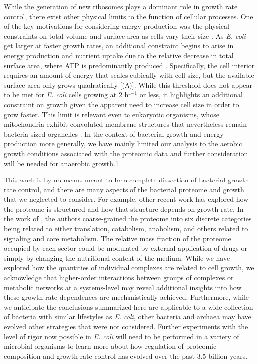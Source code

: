 While the generation of new ribosomes plays a dominant role in growth rate
control, there exist other physical limits to the function of cellular
processes. One of the key motivations for considering energy production was the
physical constraints on total volume and surface area as cells vary their size
\citep{harris2018, ojkic2019}. As \textit{E. coli} get larger at faster growth
rates, an additional constraint begins to arise in energy production and
nutrient uptake due to the relative decrease in total surface area, where ATP is
predominantly produced \citep{szenk2017}. Specifically, the cell interior
requires an amount of energy that scales cubically with cell size, but the
available surface area only grows quadratically [(A)]. While
this threshold does not appear to be met for \textit{E. coli} cells growing at 2
hr$^{-1}$ or less, it highlights an additional constraint on growth given the
apparent need to increase cell size in order to grow faster. This limit is
relevant even to eukaryotic organisms, whose mitochondria exhibit convoluted
membrane structures that nevertheless remain bacteria-sized organelles
\citep{guo2018}. In the context of bacterial growth and energy production more
generally, we have mainly limited our analysis to the aerobic growth conditions
associated with the proteomic data and further consideration will be needed for
anaerobic growth.1

This work is by no means meant to be a complete dissection of bacterial
growth rate control, and there are many aspects of the bacterial proteome and
growth that we neglected to consider. For example, other recent work
\citep{liebermeister2014, hui2015, schmidt2016} has explored how the proteome is
structured and how that structure depends on growth rate. In the work of
\cite{hui2015}, the authors coarse-grained the proteome into six discrete
categories being related to either translation, catabolism, anabolism, and
others related to signaling and core metabolism. The relative mass fraction of
the proteome occupied by each sector could be modulated by external application
of drugs or simply by changing the nutritional content of the medium. While we
have explored how the quantities of individual complexes are related to cell
growth, we acknowledge that higher-order interactions between groups of
complexes or metabolic networks at a systems-level may reveal additional
insights into how these growth-rate dependences  are mechanistically achieved.
Furthermore, while we anticipate the conclusions summarized here are applicable
to a wide collection of bacteria with similar lifestyles as \textit{E. coli},
other bacteria and archaea may have evolved other strategies that were not
considered. Further experiments with the level of rigor now possible in
\textit{E. coli} will need to be performed in a variety of microbial organisms
to learn more about how regulation of proteomic composition and  growth rate
control has evolved over the past 3.5 billion years.
